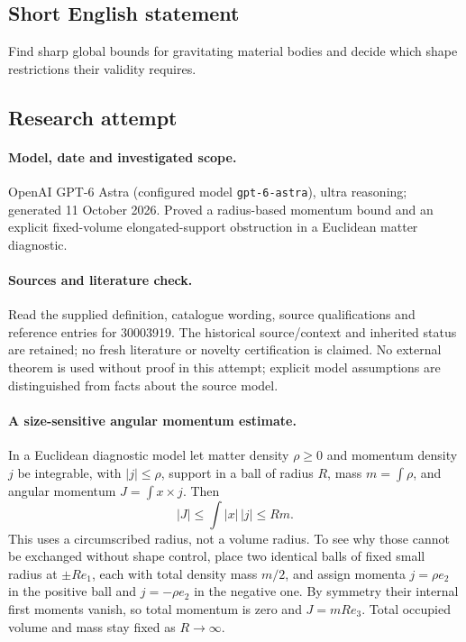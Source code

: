 \documentclass[11pt]{article}
\begin{document}
\subsection{Short English statement}
Find sharp global bounds for gravitating material bodies and decide which shape restrictions their validity requires.
\subsection{Research attempt}
\paragraph{Model, date and investigated scope.}
OpenAI GPT-6 Astra (configured model \texttt{gpt-6-astra}), ultra reasoning; generated 11 October 2026. Proved a radius-based momentum bound and an explicit fixed-volume elongated-support obstruction in a Euclidean matter diagnostic.

\paragraph{Sources and literature check.}
Read the supplied definition, catalogue wording, source qualifications and reference entries for 30003919. The historical source/context and inherited status are retained; no fresh literature or novelty certification is claimed. No external theorem is used without proof in this attempt; explicit model assumptions are distinguished from facts about the source model.

\paragraph{A size-sensitive angular momentum estimate.} In a Euclidean diagnostic model let matter density \(\rho\ge0\) and momentum density \(j\) be integrable, with \(|j|\le\rho\), support in a ball of radius \(R\), mass \(m=\int\rho\), and angular momentum \(J=\int x\times j\). Then
\[
 |J|\le\int|x|\,|j|\le Rm.
\]
This uses a circumscribed radius, not a volume radius. To see why those cannot be exchanged without shape control, place two identical balls of fixed small radius at \(\pm Re_1\), each with total density mass \(m/2\), and assign momenta \(j=\rho e_2\) in the positive ball and \(j=-\rho e_2\) in the negative one. By symmetry their internal first moments vanish, so total momentum is zero and \(J=mR e_3\). Total occupied volume and mass stay fixed as \(R\to\infty\).
\end{document}
